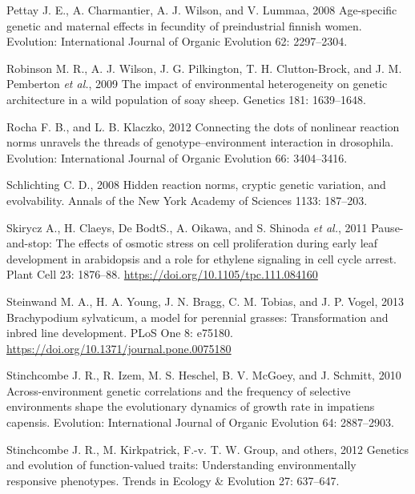\documentclass[jou,floatsintext]{apa6}
\begin{document}
\leavevmode\hypertarget{ref-pettay2008age}{}%
Pettay J. E., A. Charmantier, A. J. Wilson, and V. Lummaa, 2008 Age-specific genetic and maternal effects in fecundity of preindustrial finnish women. Evolution: International Journal of Organic Evolution 62: 2297--2304.

\leavevmode\hypertarget{ref-robinson2009impact}{}%
Robinson M. R., A. J. Wilson, J. G. Pilkington, T. H. Clutton-Brock, and J. M. Pemberton \emph{et al.}, 2009 The impact of environmental heterogeneity on genetic architecture in a wild population of soay sheep. Genetics 181: 1639--1648.

\leavevmode\hypertarget{ref-rocha2012connecting}{}%
Rocha F. B., and L. B. Klaczko, 2012 Connecting the dots of nonlinear reaction norms unravels the threads of genotype--environment interaction in drosophila. Evolution: International Journal of Organic Evolution 66: 3404--3416.

\leavevmode\hypertarget{ref-schlichting2008hidden}{}%
Schlichting C. D., 2008 Hidden reaction norms, cryptic genetic variation, and evolvability. Annals of the New York Academy of Sciences 1133: 187--203.

\leavevmode\hypertarget{ref-skirycz2011pause}{}%
Skirycz A., H. Claeys, De BodtS., A. Oikawa, and S. Shinoda \emph{et al.}, 2011 Pause-and-stop: The effects of osmotic stress on cell proliferation during early leaf development in arabidopsis and a role for ethylene signaling in cell cycle arrest. Plant Cell 23: 1876--88. \url{https://doi.org/10.1105/tpc.111.084160}

\leavevmode\hypertarget{ref-steinwand2013sylvaticum}{}%
Steinwand M. A., H. A. Young, J. N. Bragg, C. M. Tobias, and J. P. Vogel, 2013 Brachypodium sylvaticum, a model for perennial grasses: Transformation and inbred line development. PLoS One 8: e75180. \url{https://doi.org/10.1371/journal.pone.0075180}

\leavevmode\hypertarget{ref-stinchcombe2010across}{}%
Stinchcombe J. R., R. Izem, M. S. Heschel, B. V. McGoey, and J. Schmitt, 2010 Across-environment genetic correlations and the frequency of selective environments shape the evolutionary dynamics of growth rate in impatiens capensis. Evolution: International Journal of Organic Evolution 64: 2887--2903.

\leavevmode\hypertarget{ref-stinchcombe2012genetics}{}%
Stinchcombe J. R., M. Kirkpatrick, F.-v. T. W. Group, and others, 2012 Genetics and evolution of function-valued traits: Understanding environmentally responsive phenotypes. Trends in Ecology \& Evolution 27: 637--647.
\end{document}
